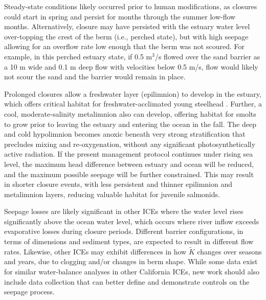 \documentclass[preprint,12pt,authoryear]{elsarticle}
\begin{document}
Steady-state conditions likely occurred prior to human modifications, as closures could start in spring and persist for months through the summer low-flow months. Alternatively, closure may have persisted with the estuary water level over-topping the crest of the berm (i.e., perched state), but with high seepage allowing for an overflow rate low enough that the berm was not scoured. For example, in this perched estuary state, if 0.5 m$^3$/s flowed over the sand barrier as a 10 m wide and 0.1 m deep flow with velocities below 0.5 m/s, flow would likely  not scour the sand and the barrier would remain in place. 
 
Prolonged closures allow a freshwater layer (epilimnion) to develop in the estuary, which offers critical habitat for freshwater-acclimated young steelhead \citep{largier20205}. Further, a cool, moderate-salinity metalimnion also can develop, offering habitat for smolts to grow prior to leaving the estuary and entering the ocean in the fall. The deep and cold hypolimnion becomes anoxic beneath very strong stratification that precludes mixing and re-oxygenation, without any significant photosynthetically active radiation. If the present management protocol continues under rising sea level, the maximum head difference between estuary and ocean will be reduced, and the maximum possible seepage will be further constrained.  This may result in shorter closure events, with less persistent and thinner epilimnion and metalimnion layers, reducing valuable habitat for juvenile salmonids.  


 Seepage losses are likely significant in other ICEs where the water level rises significantly above the ocean water level, which occurs where river inflow exceeds evaporative losses during closure periods.  Different barrier configurations, in terms of dimensions and sediment types, are expected to result in different flow rates.  Likewise, other ICEs may exhibit differences in how $\tilde K$ changes over seasons and years, due to clogging and/or changes in berm shape. While some data exist for similar water-balance analyses in other California ICEs, new work should also include data collection that can better define and demonstrate controls on the seepage process.
\end{document}
